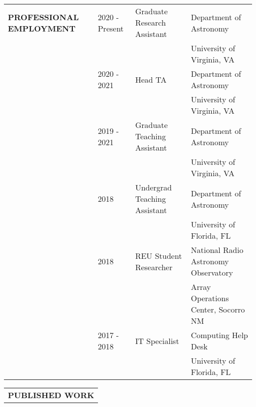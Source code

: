 \documentclass{article}
\begin{document}
\vspace{0.5cm}
\begin{tabular}{p{4cm}p{2.2cm}ll}
    \large{\textbf{PROFESSIONAL EMPLOYMENT}}
    &2020 - Present & Graduate Research Assistant & Department of Astronomy  \vspace{-0.45cm} \\
    &       &                    & \small University of Virginia, VA
    \vspace{0.125cm} \\ 
    &2020 - 2021 & Head TA            & Department of Astronomy \\
    &       &                    & \small University of Virginia, VA    \vspace{0.125cm} \\ 
    &2019 - 2021 & Graduate Teaching Assistant & Department of Astronomy \\
    &       &                    & \small University of Virginia, VA \vspace{0.125cm} \\ 
    &2018   & Undergrad Teaching Assistant & Department of Astronomy \\
    &       &                    & \small University of Florida, FL \vspace{0.125cm} \\ 
    &2018   & REU Student Researcher       & National Radio Astronomy Observatory \\
    &       &                    & \small Array Operations Center, Socorro NM \vspace{0.125cm} \\ 
    &2017 - 2018 & IT Specialist & Computing Help Desk \\
    &       &                    & \small University of Florida, FL \vspace{0.125cm} \\ 
\end{tabular}
\vspace{0.5cm}












\renewcommand\refname{\vskip -1cm}
\nocite{*}


\begin{tabular}{p{4cm}}
   \large{\textbf{PUBLISHED WORK}} \vspace{-0.45cm}\\
\end{tabular}
\end{document}
